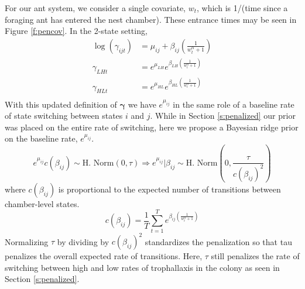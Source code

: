 \documentclass[cmbright,fleqn,referee]{envauth}
\begin{document}
For our ant system, we consider a single covariate, $w_t$, which is 1/(time since a foraging ant has entered the nest chamber). These entrance times may be seen in Figure \ref{f:pencov}. In the 2-state setting,
\begin{equation}
\begin{aligned}
\log (\gamma_{ijt}) &= \mu_{ij} + \beta_{ij} \left(\frac{1}{w_t^{\alpha} + 1}\right) \\
\gamma_{LHt} &= e^{\mu_{LH}} e^{\beta_{LH}\left(\frac{1}{w_t^{\alpha} + 1}\right)}\\
\gamma_{HLt} &= e^{\mu_{HL}} e^{\beta_{HL}\left(\frac{1}{w_t^{\alpha} + 1}\right)}\\
\end{aligned}
\end{equation}
With this updated definition of $\bm{\gamma}$ we have $e^{\mu_{ij}}$ in the same role of a baseline rate of state switching between states $i$ and $j$. While in Section \ref{s:penalized} our prior was placed on the entire rate of switching, here we propose a Bayesian ridge prior on the baseline rate, $e^{\mu_{ij}}$. 
\begin{equation}
 e^{\mu_{ij}} 
c(\beta_{ij})
\sim 
\text{H. Norm}(0, \tau)
\Rightarrow 
e^{\mu_{ij}} | \beta_{ij} \sim \text{H. Norm}\left(0, \frac{\tau}{c(\beta_{ij})^2}\right)
 \end{equation}
 where $c(\beta_{ij})$ is proportional to the expected number of transitions between chamber-level states.
\begin{equation}
  c(\beta_{ij}) =  \frac{1}{T}\sum_{t = 1}^T e^{\beta_{ij}\left(\frac{1}{w_t^{\alpha} + 1}\right)}
\end{equation}
Normalizing $\tau$ by dividing by $c(\beta_{ij})^2$ standardizes the penalization so that tau penalizes the overall expected rate of transitions. Here, $\tau$ still penalizes the rate of switching between high and low rates of trophallaxis in the colony as seen in Section \ref{s:penalized}. 
\end{document}
